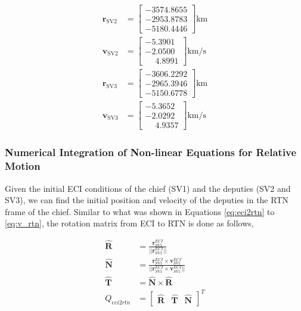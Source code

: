 \begin{align}
    \mathbf{r}_{\text{SV2}} &=
    \begin{bmatrix}
    -3574.8655 \\
    -2953.8783 \\
    -5180.4446
    \end{bmatrix} \text{km} \\
    \mathbf{v}_{\text{SV2}} &=
    \begin{bmatrix}
    -5.3901 \\
    -2.0500 \\
    \phantom{-}4.8991
    \end{bmatrix} \text{km/s} \\
    \mathbf{r}_{\text{SV3}} &=
    \begin{bmatrix}
    -3606.2292 \\
    -2965.3946 \\
    -5150.6778
    \end{bmatrix} \text{km} \\
    \mathbf{v}_{\text{SV3}} &=
    \begin{bmatrix}
    -5.3652 \\
    -2.0292 \\
    \phantom{-}4.9357
    \end{bmatrix} \text{km/s}
\end{align}

\subsubsection{Numerical Integration of Non-linear Equations for Relative Motion} \label{sec:nonlinear_rel_eom}
Given the initial ECI conditions of the chief (SV1) and the deputies (SV2 and SV3), we can find the initial position and velocity of the deputies in the RTN frame of the chief. Similar to what was shown in Equations \ref{eq:eci2rtn} to \ref{eq:v_rtn}, the rotation matrix from ECI to RTN is done as follows, 

\begin{align}
    \boldsymbol{\hat{R}} &= \frac{\boldsymbol{r}^{ECI}_{SV1}}{||\boldsymbol{r}^{ECI}_{SV1}||} \\ \label{eq:q_eci2rtn_rel}
    \boldsymbol{\hat{N}} &= \frac{\boldsymbol{r}^{ECI}_{SV1} \times \boldsymbol{v}^{ECI}_{SV1}}{||\boldsymbol{r}^{ECI}_{SV1} \times \boldsymbol{v}^{ECI}_{SV1}||} \\
    \boldsymbol{\hat{T}} &= \boldsymbol{\hat{N}} \times \boldsymbol{\hat{R}} \\
    Q_{eci2rtn} &= \begin{bmatrix}
        \boldsymbol{\hat{R}} & \boldsymbol{\hat{T}} & \boldsymbol{\hat{N}}
    \end{bmatrix}^T
\end{align}

